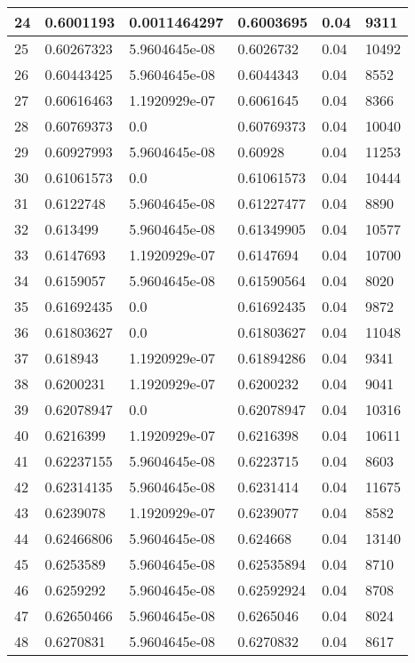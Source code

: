 \begin{longtable}{|l|l|l|l|l|l|}
24 & 0.6001193 & 0.0011464297 & 0.6003695 & 0.04 & 9311 \\ \hline 
25 & 0.60267323 & 5.9604645e-08 & 0.6026732 & 0.04 & 10492 \\ \hline 
26 & 0.60443425 & 5.9604645e-08 & 0.6044343 & 0.04 & 8552 \\ \hline 
27 & 0.60616463 & 1.1920929e-07 & 0.6061645 & 0.04 & 8366 \\ \hline 
28 & 0.60769373 & 0.0 & 0.60769373 & 0.04 & 10040 \\ \hline 
29 & 0.60927993 & 5.9604645e-08 & 0.60928 & 0.04 & 11253 \\ \hline 
30 & 0.61061573 & 0.0 & 0.61061573 & 0.04 & 10444 \\ \hline 
31 & 0.6122748 & 5.9604645e-08 & 0.61227477 & 0.04 & 8890 \\ \hline 
32 & 0.613499 & 5.9604645e-08 & 0.61349905 & 0.04 & 10577 \\ \hline 
33 & 0.6147693 & 1.1920929e-07 & 0.6147694 & 0.04 & 10700 \\ \hline 
34 & 0.6159057 & 5.9604645e-08 & 0.61590564 & 0.04 & 8020 \\ \hline 
35 & 0.61692435 & 0.0 & 0.61692435 & 0.04 & 9872 \\ \hline 
36 & 0.61803627 & 0.0 & 0.61803627 & 0.04 & 11048 \\ \hline 
37 & 0.618943 & 1.1920929e-07 & 0.61894286 & 0.04 & 9341 \\ \hline 
38 & 0.6200231 & 1.1920929e-07 & 0.6200232 & 0.04 & 9041 \\ \hline 
39 & 0.62078947 & 0.0 & 0.62078947 & 0.04 & 10316 \\ \hline 
40 & 0.6216399 & 1.1920929e-07 & 0.6216398 & 0.04 & 10611 \\ \hline 
41 & 0.62237155 & 5.9604645e-08 & 0.6223715 & 0.04 & 8603 \\ \hline 
42 & 0.62314135 & 5.9604645e-08 & 0.6231414 & 0.04 & 11675 \\ \hline 
43 & 0.6239078 & 1.1920929e-07 & 0.6239077 & 0.04 & 8582 \\ \hline 
44 & 0.62466806 & 5.9604645e-08 & 0.624668 & 0.04 & 13140 \\ \hline 
45 & 0.6253589 & 5.9604645e-08 & 0.62535894 & 0.04 & 8710 \\ \hline 
46 & 0.6259292 & 5.9604645e-08 & 0.62592924 & 0.04 & 8708 \\ \hline 
47 & 0.62650466 & 5.9604645e-08 & 0.6265046 & 0.04 & 8024 \\ \hline 
48 & 0.6270831 & 5.9604645e-08 & 0.6270832 & 0.04 & 8617 \\ \hline 

\end{longtable}
